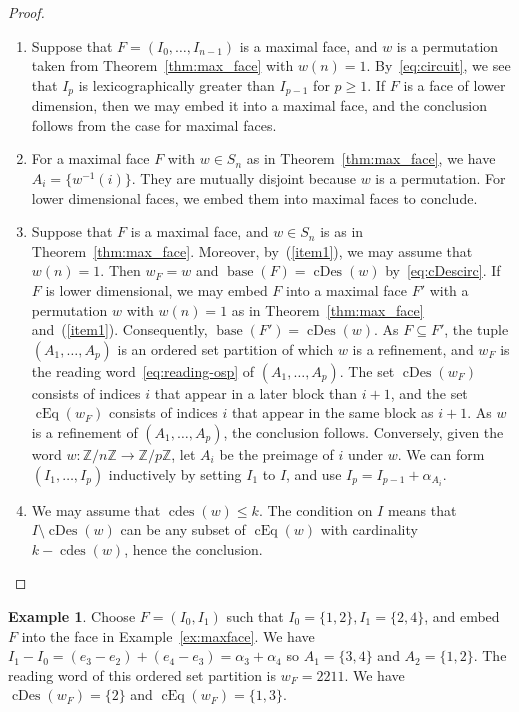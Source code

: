 \documentclass[10pt,a4paper]{amsart}
\theoremstyle{plain}
\theoremstyle{definition}
\newtheorem{example}[theorem]{Example}
\newcommand{\Z}{\mathbb{Z}}
\DeclareMathOperator{\base}{base}
\DeclareMathOperator{\cEq}{cEq}
\DeclareMathOperator{\cDes}{cDes}
\DeclareMathOperator{\cdes}{cdes}
\begin{document}
\begin{proof}
	\noindent
	\begin{enumerate}
		\item\label{item1}
		Suppose that $ F=(I_0,\dots,I_{n-1}) $
		is a maximal face, and $w$ is a permutation taken from Theorem~\ref{thm:max_face} with $w(n)=1$.
		By~\eqref{eq:circuit}, we see that $I_p$ is lexicographically greater than $I_{p-1}$ for $p \geq 1$.
		If $ F $ is a face of lower dimension, then we may embed it into a maximal face, and the conclusion follows from the case for maximal faces.
		\item For a maximal face $ F $ with $ w \in S_n $ as in Theorem~\ref{thm:max_face}, we have $ A_i =
		\{w^{-1}(i)\} $. They are mutually disjoint because $ w $ is a permutation. For lower dimensional faces, we
		embed them into maximal faces to conclude.
		\item Suppose that $ F $ is a maximal face, and $ w \in S_n $ is as in Theorem~\ref{thm:max_face}. Moreover,
		by~(\ref{item1}), we may assume that $ w(n) = 1 $. Then $ w_F = w $ and $ \base(F) = \cDes(w) $
		by~\eqref{eq:cDescirc}. If $ F $ is lower dimensional, we may embed $ F $ into a maximal face $ F' $ with a
		permutation $ w $ with $ w(n) = 1 $ as in Theorem~\ref{thm:max_face} and~(\ref{item1}). Consequently, $
		\base(F') = \cDes(w) $. As $ F \subseteq F' $, the tuple $ (A_1,\dots,A_p) $ is an ordered set partition of
		which $ w $ is a refinement, and $ w_F $ is the reading word~\eqref{eq:reading-osp} of $ (A_1,\dots,A_p) $. The
		set $ \cDes(w_F) $ consists of indices $ i $ that appear in a later block than $ i+1 $, and the set $ \cEq(w_F)
		$ consists of indices $ i $ that appear in the same block as $ i+1 $. As $ w $ is a refinement of $
		(A_1,\dots,A_p) $, the conclusion follows. Conversely, given the word $ w: \Z/n\Z \to \Z/p\Z$, let $A_i$ be the
		preimage of $i$ under $w$. We can form $ (I_1,\dots,I_p) $ inductively by setting $ I_1 $ to $ I $, and use $
		I_p = I_{p-1}+\alpha_{A_i} $.
		\item We may assume that $ \cdes(w) \leq k $. The condition on $ I $ means that $ I \setminus \cDes(w) $ can be
		any subset of $ \cEq(w) $ with cardinality $ k-\cdes(w) $, hence the conclusion.
	\end{enumerate}
\end{proof}
\begin{example}
	Choose $F = (I_0,I_1)$ such that $I_0 = \{1,2\}, I_1 = \{2,4\}$, and embed $F$ into the face in Example~\ref{ex:maxface}.
	We have $I_1 - I_0 = (e_3-e_2) + (e_4-e_3) = \alpha_3 + \alpha_4$ so $A_1 = \{3,4\}$ and $A_2 = \{1,2\}$.
	The reading word of this ordered set partition is $w_F = 2211$.
	We have $\cDes(w_F) = \{2\}$ and $\cEq(w_F) = \{1,3\}$.
\end{example}
\end{document}
